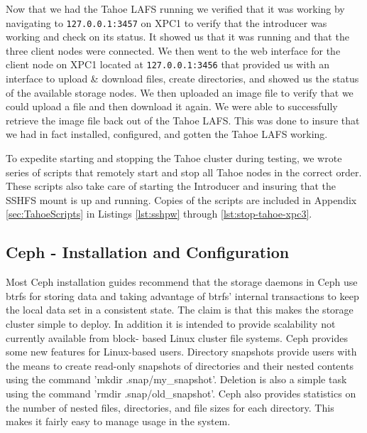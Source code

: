 \documentclass[11pt]{article}
\begin{document}
Now that we had the Tahoe LAFS running we verified that it was working
by navigating to \texttt{127.0.0.1:3457} on XPC1 to verify that the introducer
was working and check on its status. It showed us that it was running
and that the three client nodes were connected. We then went to the
web interface for the client node on XPC1 located at \texttt{127.0.0.1:3456}
that provided us with an interface to upload \& download files, create
directories, and showed us the status of the available storage
nodes. We then uploaded an image file to verify that we could upload a
file and then download it again. We were able to successfully retrieve
the image file back out of the Tahoe LAFS. This was done to insure
that we had in fact installed, configured, and gotten the Tahoe LAFS
working.

To expedite starting and stopping the Tahoe cluster during testing, we
wrote series of scripts that remotely start and stop all Tahoe nodes in the
correct order. These scripts also take care of starting the Introducer
and insuring that the SSHFS mount is up and running. Copies of the
scripts are included in Appendix \ref{sec:TahoeScripts} in Listings
\ref{lst:sshpw} through \ref{lst:stop-tahoe-xpc3}.

\subsection{Ceph - Installation and Configuration}

Most Ceph installation guides recommend that the storage daemons in Ceph 
use btrfs for storing data and taking advantage of btrfs' internal 
transactions to keep the local data set in a consistent state. The claim 
is that this makes the storage cluster simple to deploy. In addition it 
is intended to provide scalability not currently available from block-
based Linux cluster file systems. Ceph provides some new features for 
Linux-based users. Directory snapshots provide users with the means to 
create read-only snapshots of directories and their nested contents using 
the command 'mkdir .snap/my\_snapshot'.  Deletion is also a simple task 
using the command 'rmdir .snap/old\_snapshot'.  Ceph also provides 
statistics on the number of nested files, directories, and file sizes 
for each directory. This makes it fairly easy to manage usage in the 
system.
\end{document}
